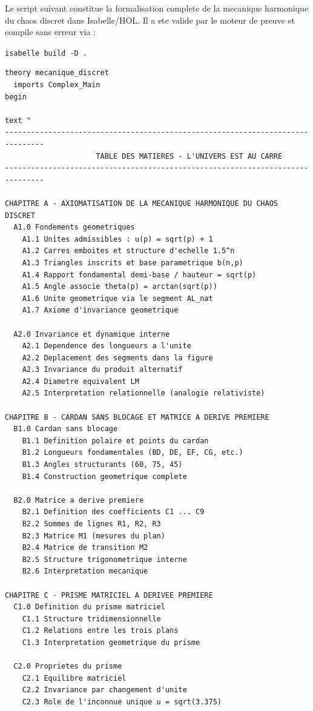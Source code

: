 \documentclass[12pt,a4paper]{article}
\begin{document}
Le script suivant constitue la formalisation complete de la mecanique
harmonique du chaos discret dans Isabelle/HOL. Il a ete valide par le
moteur de preuve et compile sans erreur via :

\texttt{isabelle build -D .}

\begin{verbatim}
theory mecanique_discret
  imports Complex_Main
begin

text "
-------------------------------------------------------------------------------
                     TABLE DES MATIERES - L'UNIVERS EST AU CARRE
-------------------------------------------------------------------------------

CHAPITRE A - AXIOMATISATION DE LA MECANIQUE HARMONIQUE DU CHAOS DISCRET
  A1.0 Fondements geometriques
    A1.1 Unites admissibles : u(p) = sqrt(p) + 1
    A1.2 Carres emboites et structure d'echelle 1.5^n
    A1.3 Triangles inscrits et base parametrique b(n,p)
    A1.4 Rapport fondamental demi-base / hauteur = sqrt(p)
    A1.5 Angle associe theta(p) = arctan(sqrt(p))
    A1.6 Unite geometrique via le segment AL_nat
    A1.7 Axiome d'invariance geometrique

  A2.0 Invariance et dynamique interne
    A2.1 Dependence des longueurs a l'unite
    A2.2 Deplacement des segments dans la figure
    A2.3 Invariance du produit alternatif
    A2.4 Diametre equivalent LM
    A2.5 Interpretation relationnelle (analogie relativiste)

CHAPITRE B - CARDAN SANS BLOCAGE ET MATRICE A DERIVE PREMIERE
  B1.0 Cardan sans blocage
    B1.1 Definition polaire et points du cardan
    B1.2 Longueurs fondamentales (BD, DE, EF, CG, etc.)
    B1.3 Angles structurants (60, 75, 45)
    B1.4 Construction geometrique complete

  B2.0 Matrice a derive premiere
    B2.1 Definition des coefficients C1 ... C9
    B2.2 Sommes de lignes R1, R2, R3
    B2.3 Matrice M1 (mesures du plan)
    B2.4 Matrice de transition M2
    B2.5 Structure trigonometrique interne
    B2.6 Interpretation mecanique

CHAPITRE C - PRISME MATRICIEL A DERIVEE PREMIERE
  C1.0 Definition du prisme matriciel
    C1.1 Structure tridimensionnelle
    C1.2 Relations entre les trois plans
    C1.3 Interpretation geometrique du prisme

  C2.0 Proprietes du prisme
    C2.1 Equilibre matriciel
    C2.2 Invariance par changement d'unite
    C2.3 Role de l'inconnue unique u = sqrt(3.375)


\end{verbatim}
\end{document}
